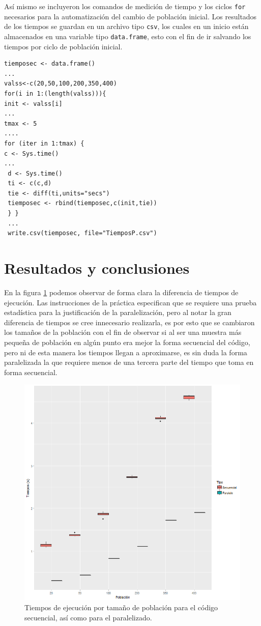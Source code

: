 \documentclass[a4paper]{article}
\begin{document}
Así mismo se incluyeron los comandos de medición de tiempo y los ciclos \texttt{for} necesarios para la automatización del cambio de población inicial. Los resultados de los tiempos se guardan en un archivo tipo \texttt{csv}, los cuales en un inicio están almacenados en una variable tipo \texttt{data.frame}, esto con el fin de ir salvando los tiempos por ciclo de población inicial.
\begin{lstlisting}[frame=single]
tiemposec <- data.frame()
...
valss<-c(20,50,100,200,350,400)
for(i in 1:(length(valss))){
init <- valss[i]
...
tmax <- 5
....
for (iter in 1:tmax) {
c <- Sys.time()
...
 d <- Sys.time()
 ti <- c(c,d)
 tie <- diff(ti,units="secs")
 tiemposec <- rbind(tiemposec,c(init,tie))
 } }
 ...
 write.csv(tiemposec, file="TiemposP.csv")
\end{lstlisting}

\section{Resultados y conclusiones}
En la figura \ref{fig:ambos} podemos observar de forma clara la diferencia de tiempos de ejecución. Las instrucciones de la práctica especifican que se requiere una prueba estadística para la justificación de la paralelización, pero al notar la gran diferencia de tiempos se cree innecesario realizarla, es por esto que se cambiaron los tamaños de la población con el fin de observar si al ser una muestra más pequeña de población en algún punto era mejor la forma secuencial del código, pero ni de esta manera los tiempos llegan a aproximarse, es sin duda la forma paralelizada la que requiere menos de una tercera parte del tiempo que toma en forma secuencial.

\begin{figure}[h!]
\centering
\includegraphics[width=0.7\linewidth]{ambos}
\caption{Tiempos de ejecución por tamaño de población para el código secuencial, así como para el paralelizado.}
\label{fig:ambos}
\end{figure}
\end{document}
